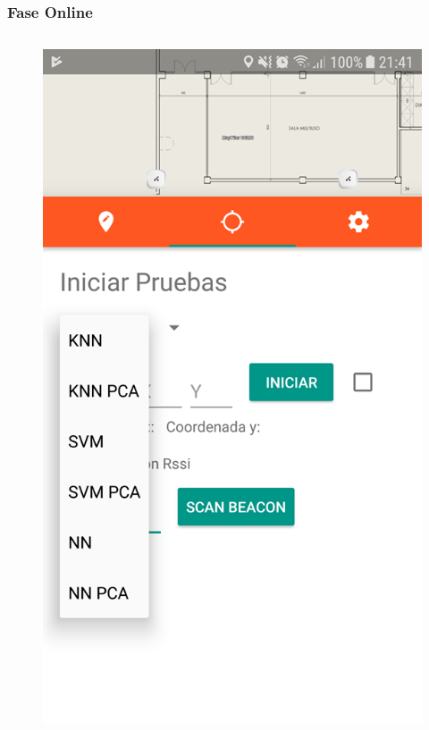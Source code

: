 \documentclass[mathserif]{beamer}
\begin{document}
\begin{frame}
\frametitle{Fase Online}

\begin{columns}[t] %

\begin{figure}
\includegraphics[width=\textwidth]{../figures/fase_online1.png}
\end{figure}


\end{columns}
\end{frame}
\end{document}
